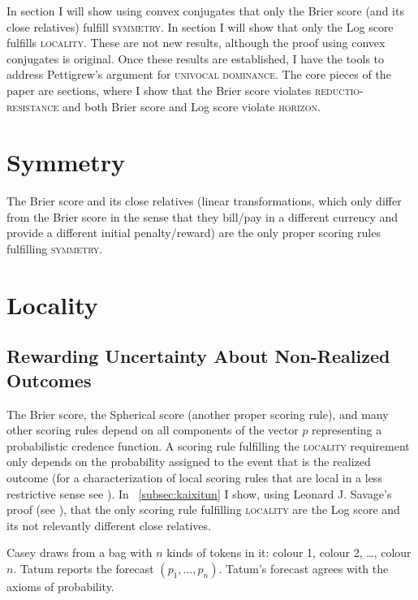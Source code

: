 \documentclass[12pt]{article}
\begin{document}
In section I will show using convex conjugates that
only the Brier score (and its close relatives) fulfill
\textsc{symmetry}. In section I will show that only the
Log score fulfills \textsc{locality}. These are not new results,
although the proof using convex conjugates is original. Once these
results are established, I have the tools to address Pettigrew's
argument for \textsc{univocal dominance}. The core pieces of the paper
are sections, where I show that the Brier score
violates \textsc{reductio-resistance} and both Brier score and Log
score violate \textsc{horizon}. 

\section{Symmetry}
\label{sec:oolohdej}

The Brier score and its close relatives (linear transformations, which
only differ from the Brier score in the sense that they bill/pay in a
different currency and provide a different initial penalty/reward) are
the only proper scoring rules fulfilling \textsc{symmetry}.

\section{Locality}
\label{sec:siethohj}

\subsection{Rewarding Uncertainty About Non-Realized Outcomes}
\label{subsec:paivaete}

The Brier score, the Spherical score (another proper scoring rule),
and many other scoring rules depend on all components of the vector
$p$ representing a probabilistic credence function. A scoring rule
fulfilling the \textsc{locality} requirement only depends on the
probability assigned to the event that is the realized outcome (for a
characterization of local scoring rules that are local in a less
restrictive sense see ). In
{\ubsection}~\ref{subsec:kaixitun} I show, using Leonard J. Savage's
proof (see ), that the only scoring rule
fulfilling \textsc{locality} are the Log score and its not relevantly
different close relatives.

\begin{quotex}
  \label{ex:augheebi} Casey draws from a bag with $n$
  kinds of tokens in it: colour 1, colour 2, {\ldots}, colour $n$.
  Tatum reports the forecast $(p_{1},{\ldots},p_{n})$. Tatum's
  forecast agrees with the axioms of probability.
\end{quotex}
\end{document}
